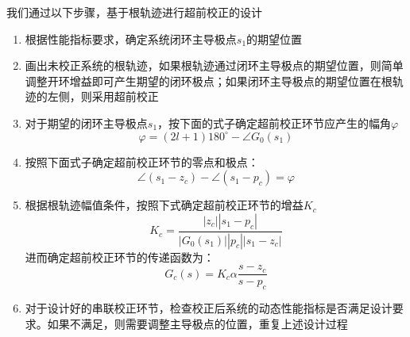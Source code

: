 我们通过以下步骤，基于根轨迹进行超前校正的设计
\begin{enumerate}
    \item 根据性能指标要求，确定系统闭环主导极点$s_1$的期望位置
    \item 画出未校正系统的根轨迹，如果根轨迹通过闭环主导极点的期望位置，则简单调整开环增益即可产生期望的闭环极点；如果闭环主导极点的期望位置在根轨迹的左侧，则采用超前校正
    \item 对于期望的闭环主导极点$s_1$，按下面的式子确定超前校正环节应产生的幅角$\varphi$
    \begin{equation*}
        \varphi = (2l+1) 180^\circ - \angle G_0(s_1)
    \end{equation*}
    \item 按照下面式子确定超前校正环节的零点和极点：
    \begin{equation*}
        \angle(s_1-z_c) - \angle(s_1-p_c) = \varphi
    \end{equation*}
    \item 根据根轨迹幅值条件，按照下式确定超前校正环节的增益$K_c$
    \begin{equation*}
        K_c = \frac{\left\lvert z_c \right\rvert \left\lvert s_1 - p_c \right\rvert  }{\left\lvert G_0(s_1) \right\rvert \left\lvert p_c \right\rvert \left\lvert s_1 - z_c \right\rvert  }
    \end{equation*}
    进而确定超前校正环节的传递函数为：
    \begin{equation*}
        G_c(s) = K_c \alpha  \frac{s- z_c}{s - p_c}
    \end{equation*}
    \item 对于设计好的串联校正环节，检查校正后系统的动态性能指标是否满足设计要求。如果不满足，则需要调整主导极点的位置，重复上述设计过程
\end{enumerate}

